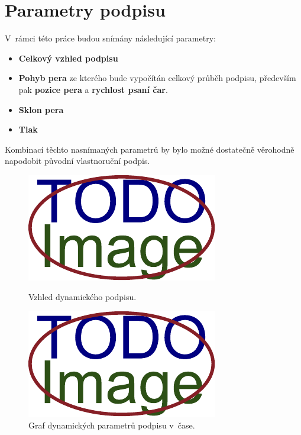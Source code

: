 \section{Parametry podpisu}
V~rámci této práce budou snímány následující parametry:
\begin{itemize}
  \item{\textbf{Celkový vzhled podpisu}}
  \item{\textbf{Pohyb pera} ze kterého bude vypočítán celkový průběh podpisu, především pak \textbf{pozice pera} a \textbf{rychlost psaní čar}.} %
  \item{\textbf{Sklon pera}} %
  \item{\textbf{Tlak}} %
\end{itemize}
Kombinací těchto nasnímaných parametrů by bylo možné dostatečně věrohodně napodobit původní vlastnoruční podpis. 

\begin{figure}[h]
\centering
\begin{minipage}{0.45\textwidth}
    \centering
    \includegraphics[width=\textwidth]{obrazky-figures/placeholder.pdf}
    \caption{Vzhled dynamického podpisu.}
    \label{fig:first-image}
\end{minipage}\hfill
\begin{minipage}{0.45\textwidth}
    \centering
    \includegraphics[width=\textwidth]{obrazky-figures/placeholder.pdf}
    \caption{Graf dynamických parametrů podpisu v~čase.}
    \label{fig:second-image}
\end{minipage}
\end{figure}

